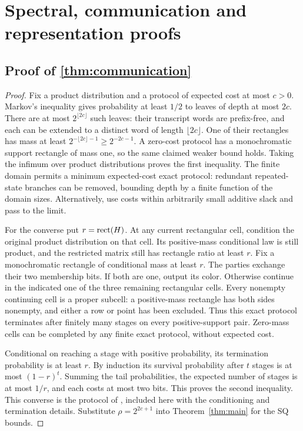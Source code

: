 \section{Spectral, communication and representation proofs}\label{app:proofs-E}

\subsection[Proof of result communication]{Proof of \cref{thm:communication}}\label{proof:communication}
\begin{proof}
Fix a product distribution and a protocol of expected cost at most $c>0$. Markov's inequality gives probability at least $1/2$ to leaves of depth at most $2c$. There are at most $2^{\lfloor2c\rfloor}$ such leaves: their transcript words are prefix-free, and each can be extended to a distinct word of length $\lfloor2c\rfloor$. One of their rectangles has mass at least $2^{-\lfloor2c\rfloor-1}\ge2^{-2c-1}$. A zero-cost protocol has a monochromatic support rectangle of mass one, so the same claimed weaker bound holds. Taking the infimum over product distributions proves the first inequality. The finite domain permits a minimum expected-cost exact protocol: redundant repeated-state branches can be removed, bounding depth by a finite function of the domain sizes. Alternatively, use costs within arbitrarily small additive slack and pass to the limit.

For the converse put $r=\operatorname{rect}(H)$. At any current rectangular cell, condition the original product distribution on that cell. Its positive-mass conditional law is still product, and the restricted matrix still has rectangle ratio at least $r$. Fix a monochromatic rectangle of conditional mass at least $r$. The parties exchange their two membership bits. If both are one, output its color. Otherwise continue in the indicated one of the three remaining rectangular cells. Every nonempty continuing cell is a proper subcell: a positive-mass rectangle has both sides nonempty, and either a row or point has been excluded. Thus this exact protocol terminates after finitely many stages on every positive-support pair. Zero-mass cells can be completed by any finite exact protocol, without expected cost.

Conditional on reaching a stage with positive probability, its termination probability is at least $r$. By induction its survival probability after $t$ stages is at most $(1-r)^t$. Summing the tail probabilities, the expected number of stages is at most $1/r$, and each costs at most two bits. This proves the second inequality. This converse is the protocol of \citet[Proposition~3.14]{HHPTZ22}, included here with the conditioning and termination details. Substitute $\rho=2^{2c+1}$ into Theorem~\ref{thm:main} for the SQ bounds.
\end{proof}

